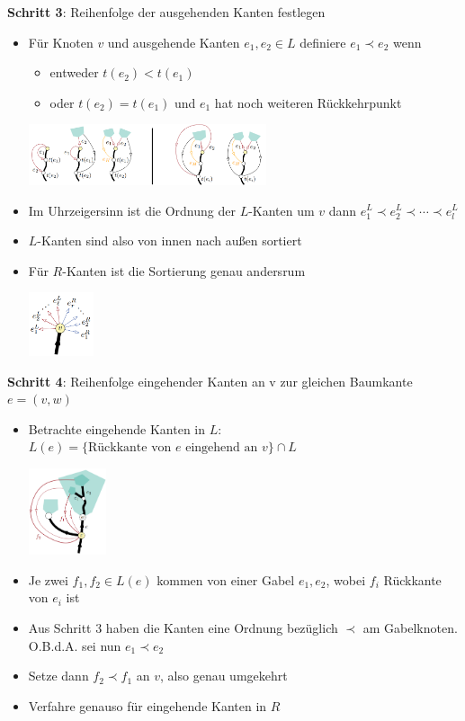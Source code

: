 \textbf{Schritt 3}: Reihenfolge der ausgehenden Kanten festlegen
\begin{itemize}
	\item Für Knoten $v$ und ausgehende Kanten $e_1,e_2\in L$ definiere $e_1\prec e_2$ wenn
	\begin{itemize}
		\item entweder $t(e_2)<t(e_1)$
		\item oder $t(e_2)=t(e_1)$ und $e_1$ hat noch weiteren Rückkehrpunkt
	\end{itemize}
	\begin{center}
		\includegraphics[width=0.55\textwidth]{images/lr-5.png}
	\end{center}
	\item Im Uhrzeigersinn ist die Ordnung der $L$-Kanten um $v$ dann $e_1^L\prec e_2^L\prec\cdots\prec e_l^L$
	\item $L$-Kanten sind also von innen nach außen sortiert
	\item Für $R$-Kanten ist die Sortierung genau andersrum
	\begin{center}
		\includegraphics[width=0.15\textwidth]{images/lr-6.png}
	\end{center}
\end{itemize}

\textbf{Schritt 4}: Reihenfolge eingehender Kanten an v zur gleichen Baumkante $e=(v,w)$
\begin{itemize}
	\item Betrachte eingehende Kanten in $L$: $L(e)=\{\text{Rückkante von }e\text{ eingehend an }v\}\cap L$
	\begin{center}
		\includegraphics[width=0.18\textwidth]{images/lr-7.png}
	\end{center}
	\item Je zwei $f_1,f_2\in L(e)$ kommen von einer Gabel $e_1,e_2$, wobei $f_i$ Rückkante von $e_i$ ist
	\item Aus Schritt 3 haben die Kanten eine Ordnung bezüglich $\prec$ am Gabelknoten. O.B.d.A. sei nun $e_1\prec e_2$
	\item Setze dann $f_2\prec f_1$ an $v$, also genau umgekehrt
	\item Verfahre genauso für eingehende Kanten in $R$
\end{itemize}

